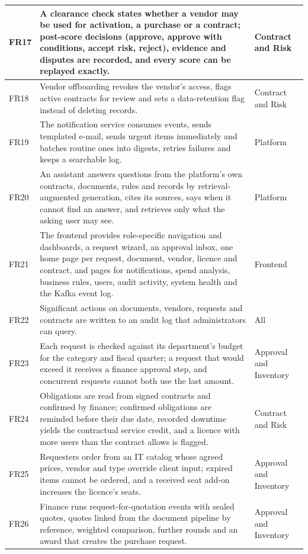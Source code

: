 {\begin{longtable}{|L{0.07\textwidth}|L{0.64\textwidth}|L{0.17\textwidth}|}
FR17 & A clearance check states whether a vendor may be used for activation, a purchase or a contract; post-score decisions (approve, approve with conditions, accept risk, reject), evidence and disputes are recorded, and every score can be replayed exactly. & Contract and Risk \\ \hline
FR18 & Vendor offboarding revokes the vendor's access, flags active contracts for review and sets a data-retention flag instead of deleting records. & Contract and Risk \\ \hline
FR19 & The notification service consumes events, sends templated e-mail, sends urgent items immediately and batches routine ones into digests, retries failures and keeps a searchable log. & Platform \\ \hline
FR20 & An assistant answers questions from the platform's own contracts, documents, rules and records by retrieval-augmented generation, cites its sources, says when it cannot find an answer, and retrieves only what the asking user may see. & Platform \\ \hline
FR21 & The frontend provides role-specific navigation and dashboards, a request wizard, an approval inbox, one home page per request, document, vendor, licence and contract, and pages for notifications, spend analysis, business rules, users, audit activity, system health and the Kafka event log. & Frontend \\ \hline
FR22 & Significant actions on documents, vendors, requests and contracts are written to an audit log that administrators can query. & All \\ \hline
FR23 & Each request is checked against its department's budget for the category and fiscal quarter; a request that would exceed it receives a finance approval step, and concurrent requests cannot both use the last amount. & Approval and Inventory \\ \hline
FR24 & Obligations are read from signed contracts and confirmed by finance; confirmed obligations are reminded before their due date, recorded downtime yields the contractual service credit, and a licence with more users than the contract allows is flagged. & Contract and Risk \\ \hline
FR25 & Requesters order from an IT catalog whose agreed prices, vendor and type override client input; expired items cannot be ordered, and a received seat add-on increases the licence's seats. & Approval and Inventory \\ \hline
FR26 & Finance runs request-for-quotation events with sealed quotes, quotes linked from the document pipeline by reference, weighted comparison, further rounds and an award that creates the purchase request. & Approval and Inventory \\ \hline

\end{longtable}}
